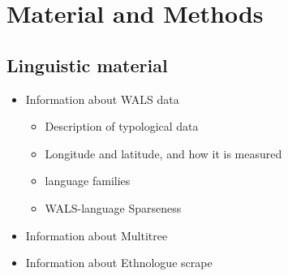 \documentclass[11pt]{article}
\begin{document}
\section{Material and Methods}
\subsection{Linguistic material}
\begin{itemize}
\item Information about WALS data
\begin{itemize} \item Description of typological data
\item Longitude and latitude, and how it is measured
%
\item language families
\item WALS-language Sparseness \end{itemize}
\item Information about Multitree\cite{multitree}
\item Information about Ethnologue\cite{ethnologue} scrape %
\end{itemize}
\end{document}

